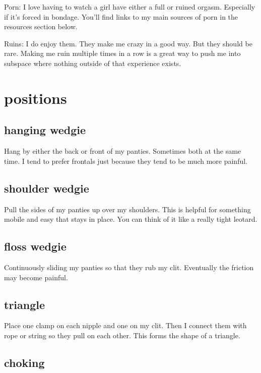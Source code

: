 \documentclass{article}
\begin{document}
Porn:
I love having to watch a girl have either a full or ruined orgasm.
Especially if it's forced in bondage.
You'll find links to my main sources of porn in the resources section below.

Ruins:
I do enjoy them. They make me crazy in a good way. But they should be rare.
Making me ruin multiple times in a row is a great way to push me into subspace where nothing outside of that experience exists.

\newpage

\section{positions}

\subsection{hanging wedgie}

Hang by either the back or front of my panties.
Sometimes both at the same time.
I tend to prefer frontals just because they tend to be much more painful.

\subsection{shoulder wedgie}

Pull the sides of my panties up over my shoulders.
This is helpful for something mobile and easy that stays in place.
You can think of it like a really tight leotard.

\subsection{floss wedgie}

Continuously sliding my panties so that they rub my clit.
Eventually the friction may become painful.

\subsection{triangle}

Place one clamp on each nipple and one on my clit.
Then I connect them with rope or string so they pull on each other.
This forms the shape of a triangle.

\subsection{choking}
\end{document}
